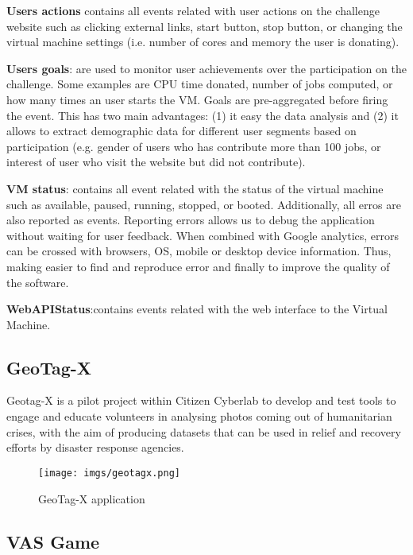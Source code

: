 \documentclass{article}
\begin{document}
\textbf{Users actions} contains all events related with user actions on the challenge website such as clicking external links, start button,  stop button, or changing the  virtual machine settings (i.e. number of cores and memory the user is donating). 

\textbf{Users goals}: are used to monitor user achievements over the participation on the challenge. Some examples are CPU time donated, number of jobs computed, or how many times an user starts the VM. Goals are pre-aggregated before firing the event. This has two main advantages: (1) it easy the data analysis and (2) it allows to extract demographic data for different user segments based on participation (e.g. gender of users who has contribute more than 100 jobs, or interest of user who visit the website but did not contribute). 

\textbf{VM status}: contains all event related with the status of the virtual machine such as available, paused, running, stopped, or booted. Additionally, all erros are also reported as events. Reporting errors allows us to debug the application without waiting for user feedback. When combined with Google analytics, errors can be crossed with browsers, OS, mobile or desktop device information. Thus, making easier to find and reproduce error and finally to improve the quality of the software. 

\textbf{WebAPIStatus}:contains events related with the web interface to the Virtual Machine.



\subsection{GeoTag-X}

Geotag-X is a pilot project within Citizen Cyberlab to develop and test tools to engage and educate volunteers in analysing photos coming out of humanitarian crises, with the aim of producing datasets that can be used in relief and recovery efforts by disaster response agencies.



\begin{figure}[th]
  \begin{center}
		\texttt{[image: imgs/geotagx.png]}
  \end{center}
\caption{GeoTag-X application}
\label{img:geotagx}
\end{figure}


\subsection{VAS Game}
\end{document}
